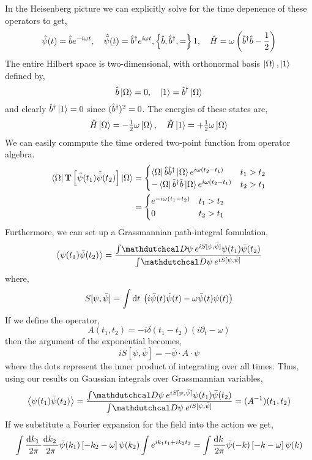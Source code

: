 \documentclass[12pt]{article}
\begin{document}
In the Heisenberg picture we can explicitly solve for the time depenence of these operators to get,
\[ \hat{\psi}(t) = \hat{b} e^{-i\omega t}, \quad \hat{\bar{\psi}}(t) = \hat{b}^\dagger e^{i \omega t}, \left\{ \hat{b}, \hat{b}^\dagger , = \right\} 1, \quad \hat{H} = \omega \left( \hat{b}^\dagger \hat{b} - \frac{1}{2} \right) \]
The entire Hilbert space is two-dimensional, with orthonormal basis $\left| \Omega \right>, \left| 1 \right>$ defined by,
\[ \hat{b} \left| \Omega \right> = 0, \quad \left| 1 \right> = \hat{b}^\dagger \left| \Omega \right> \]
and clearly $\hat{b}^\dagger \left| 1 \right> = 0$ since $(\hat{b}^\dagger)^2 = 0$. The energies of these states are,
\[ \hat{H} \left| \Omega \right> = - \tfrac{1}{2} \omega \left| \Omega \right>, \quad \hat{H} \left| 1 \right> = + \tfrac{1}{2} \omega \left| \Omega \right> \]
We can easily commpute the time ordered two-point function from operator algebra.
\begin{align*}
\left< \Omega \right| \mathbf{T}\left[  \hat{\psi}(t_1) \hat{\bar{\psi}}(t_2)  \right] \left| \Omega \right> & =
\begin{cases}
\left< \Omega \right| \hat{b} \hat{b}^\dagger \left| \Omega \right> e^{i \omega (t_2 - t_1)} & t_1 > t_2
\\
- \left< \Omega \right| \hat{b}^\dagger \hat{b} \left| \Omega \right> e^{i \omega (t_2 - t_1)} & t_2 > t_1
\end{cases}
\\
& = 
\begin{cases}
e^{-i \omega (t_1 - t_2)} & t_1 > t_2
\\
0 & t_2 > t_1
\end{cases}
\end{align*} 
Furthermore, we can set up a Grassmannian path-integral fomulation,
\[ \EV{\psi(t_1) \bar{\psi}(t_2) } = \frac{\int \pathd{\psi} e^{i S[\psi, \bar{\psi}]} \psi(t_1) \bar{\psi}(t_2)}{\int \pathd{\psi} e^{i S[\psi, \bar{\psi}]}} \]
where,
\[ S[\psi, \bar{\psi}] = \int \mathrm{d}t \: \left( i \bar{\psi}(t) \dot{\psi}(t) - \omega \bar{\psi}(t) \psi(t) \right) \]
If we define the operator,
\[ A(t_1, t_2) = -i \delta(t_1 - t_2) \left( i \partial_t - \omega \right) \]
then the argument of the exponential becomes,
\[ i S[\psi, \bar{\psi}] = - \bar{\psi} \cdot A \cdot \psi \]
where the dots represent the inner product of integrating over all times. Thus, using our results on Gaussian integrals over Grassmannian variables,
\[ \EV{\psi(t_1) \bar{\psi}(t_2) } = \frac{\int \pathd{\psi} e^{i S[\psi, \bar{\psi}]} \psi(t_1) \bar{\psi}(t_2)}{\int \pathd{\psi} e^{i S[\psi, \bar{\psi}]}}  = (A^{-1})(t_1, t_2) \]
If we substitute a Fourier expansion for the field into the action we get,
\[ \int \frac{\mathrm{d}k_1 \:}{2 \pi} \frac{\mathrm{d}k_2 \:}{2 \pi} \bar{\psi}(k_1) \left[ - k_2 - \omega \right] \psi(k_2) \int e^{i k_1 t_1 + i k_2 t_2} =  \int \frac{\mathrm{d}k \:}{2 \pi} \bar{\psi}(-k) \left[ -k - \omega \right] \psi(k) \]
\end{document}
